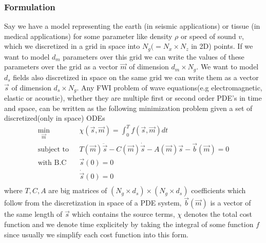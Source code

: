 \documentclass[10pt]{SelfArx} %
\theoremstyle{definition}
\begin{document}
\subsubsection{Formulation}{}
Say we have a model representing the earth (in seismic applications) or tissue (in medical applications) for some parameter like density $\rho$ or speed of sound $v$, which we discretized in a grid in space into $N_g  (= N_x \times N_z$ in 2D) points. If we want to model $d_m$ parameters over this grid we can write the values of these parameters over the grid as a vector $\vec{m}$ of dimension $d_m \times N_g$. We want to model $d_s$ fields also discretized in space on the same grid we can write them as a vector $\vec{s}$ of dimension $d_s \times N_g$. Any FWI problem of wave equations(e.g electromagnetic, elastic or acoustic), whether they are  multiple first or second order PDE's in time and space, can be written as the following minimization problem given a set of discretized(only in space) ODEs
\begin{equation}
\label{eq:discretised_linear_system}
\begin{aligned}
\underset{\vec{m}}{\text{min}}\  & \chi\left(\vec{s},\vec{m}\right) =   \int_0^T f\left(\vec{s},\vec{m}\right) dt \\
\text{subject to}\ \ \   &   T\left(\vec{m}\right)\ddot{\vec{s}} - C\left(\vec{m}\right)\dot{\vec{s}} - A\left(\vec{m}\right)\vec{s} -\vec{b}\left(\vec{m}\right)= 0 \\
 \text{with B.C}\ \ \  &  \vec{s}\left(0\right)  = 0 \\
 &  \dot{\vec{s}}\left(0\right)  = 0 \\
\end{aligned}
\end{equation}
where $T, C, A$ are big matrices of $(N_g \times d_s) \times (N_g \times d_s)$ coefficients which follow from the discretization in space of a PDE system, $\vec{b}\left(\vec{m}\right)$ is a vector of the same length of $\vec{s}$ which contains the source terms, $\chi$ denotes the total cost function and we denote time explicitely by taking the integral of some function $f$ since usually we simplify each cost function into this form. 
\end{document}
